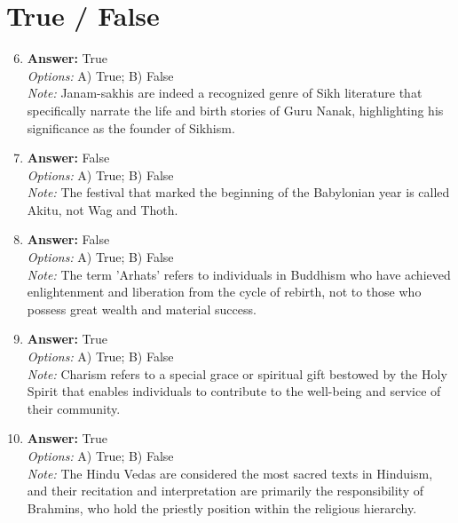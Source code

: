 \documentclass[12pt]{article}
\begin{document}
\section*{True / False}
\begin{enumerate}[label=\arabic*.]
\setcounter{enumi}{5}
\item \textbf{Answer:} True
\\ \textit{Options:} A) True; B) False
\\ \textit{Note:} Janam-sakhis are indeed a recognized genre of Sikh literature that specifically narrate the life and birth stories of Guru Nanak, highlighting his significance as the founder of Sikhism.
\item \textbf{Answer:} False
\\ \textit{Options:} A) True; B) False
\\ \textit{Note:} The festival that marked the beginning of the Babylonian year is called Akitu, not Wag and Thoth.
\item \textbf{Answer:} False
\\ \textit{Options:} A) True; B) False
\\ \textit{Note:} The term 'Arhats' refers to individuals in Buddhism who have achieved enlightenment and liberation from the cycle of rebirth, not to those who possess great wealth and material success.
\item \textbf{Answer:} True
\\ \textit{Options:} A) True; B) False
\\ \textit{Note:} Charism refers to a special grace or spiritual gift bestowed by the Holy Spirit that enables individuals to contribute to the well-being and service of their community.
\item \textbf{Answer:} True
\\ \textit{Options:} A) True; B) False
\\ \textit{Note:} The Hindu Vedas are considered the most sacred texts in Hinduism, and their recitation and interpretation are primarily the responsibility of Brahmins, who hold the priestly position within the religious hierarchy.
\end{enumerate}
\end{document}

